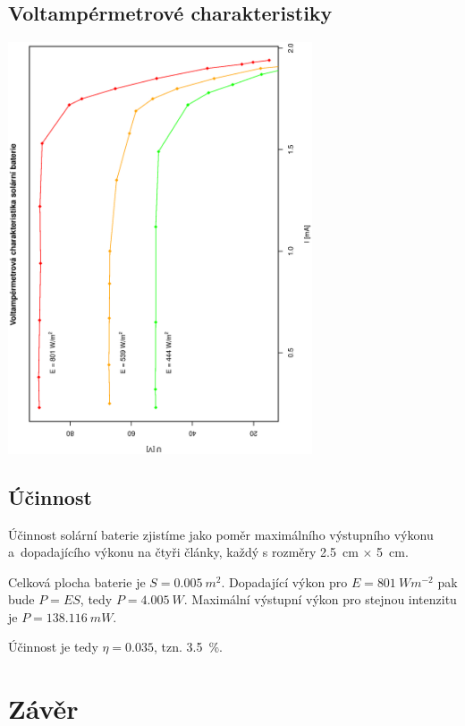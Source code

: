 \documentclass[10pt]{article}
\begin{document}
\subsection{Voltampérmetrové charakteristiky}
\begin{center}
\includegraphics[width=9cm,angle=270]{graf3.eps} \\[1cm]
\end{center}

\subsection{Účinnost}
Účinnost solární baterie zjistíme jako poměr maximálního výstupního výkonu 
a~dopadajícího výkonu na čtyři články, každý s rozměry 2.5~cm $\times$ 5~cm.

Celková plocha baterie je $S = 0.005~m^2$. Dopadající výkon pro $E =
801~Wm^{-2}$ pak bude $P = ES$, tedy $P = 4.005~W$. Maximální výstupní výkon 
pro stejnou intenzitu je $P = 138.116~mW$.

Účinnost je tedy $\eta = 0.035$, tzn. 3.5~\%.

\section{Závěr} 
\end{document}
